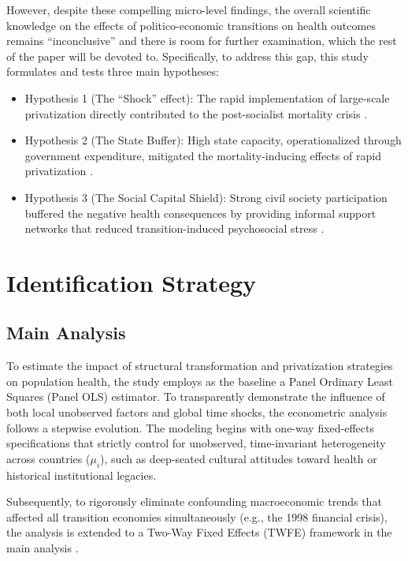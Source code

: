 \documentclass[en,magisterska]{pracamgr}
\begin{document}
However, despite these compelling micro-level findings, the overall scientific knowledge on the effects of politico-economic transitions on health outcomes remains ``inconclusive'' and there 
 is room for further examination, which the rest of the paper will be devoted to. Specifically, to address this gap, this study formulates and tests three main hypotheses:

\begin{itemize}
    \item Hypothesis 1 (The ``Shock'' effect): The rapid implementation of large-scale privatization directly contributed to the post-socialist mortality crisis 
    \citep{Stuckler2009, King2009}.
    \item Hypothesis 2 (The State Buffer): High state capacity, operationalized through government expenditure, mitigated the mortality-inducing effects of rapid privatization 
    \citep{Hamm2012}.
    \item Hypothesis 3 (The Social Capital Shield): Strong civil society participation buffered the negative health consequences by providing informal support networks that reduced 
    transition-induced psychosocial stress \citep{Stuckler2009, Scheiring2018}.
\end{itemize}


\section{Identification Strategy}
\subsection{Main Analysis}

To estimate the impact of structural transformation and privatization strategies on population health, the study employs as the baseline a Panel Ordinary Least Squares (Panel OLS) estimator. To transparently 
demonstrate the influence of both local unobserved factors and global time shocks, the econometric analysis follows a stepwise evolution. The modeling begins with one-way fixed-effects 
specifications that strictly control for unobserved, time-invariant heterogeneity across countries ($\mu_{i}$), such as deep-seated cultural attitudes toward health or historical institutional 
legacies. 

Subsequently, to rigorously eliminate confounding macroeconomic trends that affected all transition economies simultaneously (e.g., the 1998 financial crisis), the analysis is extended 
to a Two-Way Fixed Effects (TWFE) framework in the main analysis \citep{Wooldridge2010, Allison2009}.
\end{document}
